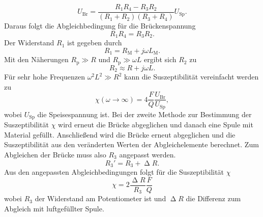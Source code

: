 \begin{equation*}
U_\text{Br} = \frac{R_1R_4-R_3R_2}{(R_1+R_2)(R_3+R_4)}U_\text{Sp}.
\end{equation*}
Daraus folgt die Abgleichbedingung für die Brückenspannung
\begin{equation*}
R_1R_4 = R_3R_2.
\end{equation*}
Der Widerstand $R_1$ ist gegeben durch
\begin{equation*}
R_1 = R_\text{M} + j \omega L_\text{M}.
\end{equation*}
Mit den Näherungen $R_\text{p} \gg R $ und $R_\text{p} \gg \omega L$ ergibt sich $R_2$ zu
\begin{equation*}
R_2 \approx R + j \omega L.
\end{equation*}
Für sehr hohe Frequenzen $\omega^2 L^2 \gg R^2$ kann die Suszeptibilität vereinfacht werden zu
\begin{equation}
	\label{eqn:susz1}
	\chi(\omega \rightarrow \infty) = 4 \frac{F}{Q}\frac{U_\text{Br}}{U_\text{Sp}},
\end{equation}
wobei $U_\text{Sp}$ die Speisespannung ist.
Bei der zweite Methode zur Bestimmung der Suszeptibilität $\chi$ wird erneut die Brücke abgeglichen und danach eine Spule mit Material gefüllt. Anschließend wird die Brücke erneut
abgeglichen und die Suszeptibilität aus den veränderten Werten der Abgleichelemente berechnet.
Zum Abgleichen der Brücke muss also $R_3$ angepasst werden.
\begin{equation*}
R_3' = R_3 + \upDelta R.
\end{equation*}
Aus den angepassten Abgleichbedingungen folgt für die Suszeptibilität $\chi$
\begin{equation}
	\label{eqn:susz2}
	\chi = 2 \frac{\upDelta R}{R_3}\frac{F}{Q}
\end{equation}
wobei $R_3$ der Widerstand am Potentiometer ist und $\upDelta R$ die Differenz zum Abgleich mit luftgefüllter Spule.

\cite{Anleitung606}
